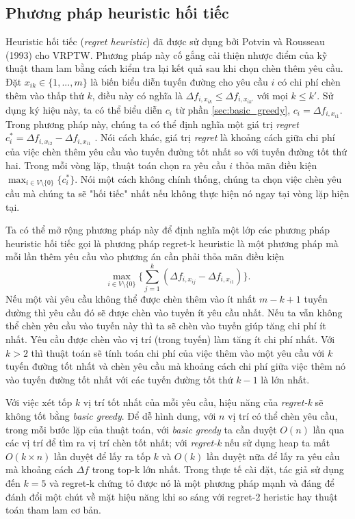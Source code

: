 \subsection{Phương pháp heuristic hối tiếc}
Heuristic hối tiếc (\textit{regret heuristic}) đã được sử dụng bởi Potvin và Rousseau (1993) \cite{potvin1993parallel} cho VRPTW. Phương pháp này cố gắng cải thiện nhược điểm của kỹ thuật tham lam bằng cách kiểm tra lại kết quả sau khi chọn chèn thêm yêu cầu. Đặt $x_{ik} \in \{1, ..., m\}$ là biến biểu diễn tuyến đường cho yêu cầu $i$ có chi phí chèn thêm vào thấp thứ $k$, điều này có nghĩa là $\Delta f_{i, x_{ik}} \leqslant \Delta f_{i, x_{ik'}}$ với mọi $k \leq k'$. Sử dụng ký hiệu này, ta có thể biểu diễn $c_i$ từ phần \ref{sec:basic_greedy}, $c_i = \Delta f_{i, x_{i1}}$. Trong phương pháp này, chúng ta có thể định nghĩa một giá trị \textit{regret} $c_i^* = \Delta f_{i, x_{i2}} - \Delta f_{i, x_{i1}}$ . Nói cách khác, giá trị \textit{regret} là khoảng cách giữa chi phí của việc chèn thêm yêu cầu vào tuyến đường tốt nhất so với tuyến đường tốt thứ hai. Trong mỗi vòng lặp, thuật toán chọn ra yêu cầu $i$ thỏa mãn điều kiện $\max_{i \in V \setminus \{0\}} \{c_i^*\}$. Nói một cách không chính thống, chúng ta chọn việc chèn yêu cầu mà chúng ta sẽ "hối tiếc" nhất nếu không thực hiện nó ngay tại vòng lặp hiện tại.

Ta có thể mở rộng phương pháp này để định nghĩa một lớp các phương pháp heuristic hối tiếc gọi là phương pháp regret-k heuristic là một phương pháp mà mỗi lần thêm yêu cầu vào phương án cần phải thỏa mãn điều kiện
\begin{equation}
    \max\limits_{i \in V \setminus \{0\} } \{ \sum_{j=1}^k (\Delta f_{i, x_{ij}} - \Delta f_{i, x_{i1}}) \}.
\end{equation}
Nếu một vài yêu cầu không thể được chèn thêm vào ít nhất $m-k+1$ tuyến đường thì yêu cầu đó sẽ được chèn vào tuyến ít yêu cầu nhất. Nếu ta vẫn không thể chèn yêu cầu vào tuyến này thì ta sẽ chèn vào tuyến giúp tăng chi phí ít nhất. Yêu cầu được chèn vào vị trí (trong tuyến) làm tăng ít chi phí nhất. Với $k>2$ thì thuật toán sẽ tính toán chi phí của việc thêm vào một yêu cầu với $k$ tuyến đường tốt nhất và chèn yêu cầu mà khoảng cách chi phí giữa việc thêm nó vào tuyến đường tốt nhất với các tuyến đường tốt thứ $k-1$ là lớn nhất. 

Với việc xét tốp $k$ vị trí tốt nhất của mỗi yêu cầu, hiệu năng của \textit{regret-k} sẽ không tốt bằng \textit{basic greedy}. Để dễ hình dung, với $n$ vị trí có thể chèn yêu cầu, trong mỗi bước lặp của thuật toán, với \textit{basic greedy} ta cần duyệt $O(n)$ lần qua các vị trí để tìm ra vị trí chèn tốt nhất; với \textit{regret-k} nếu sử dụng heap ta mất $O(k \times n)$ lần duyệt để  lấy ra tốp $k$ và $O(k)$ lần duyệt nữa để lấy ra yêu cầu mà khoảng cách $\Delta f$ trong top-k lớn nhất. Trong thực tế cài đặt, tác giả sử dụng đến $k=5$ và regret-k chứng tỏ được nó là một phương pháp mạnh và đáng để đánh đổi một chút về mặt hiệu năng khi so sáng với regret-2 heristic hay thuật toán tham lam cơ bản.